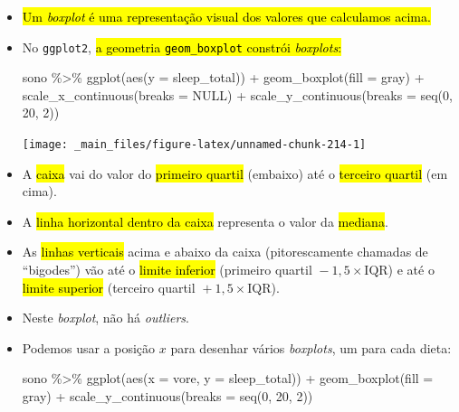 \documentclass[
  11pt]{report}
\newenvironment{Shaded}{\begin{snugshade}}{\end{snugshade}}
\newcommand{\AttributeTok}[1]{\textcolor[rgb]{0.77,0.63,0.00}{#1}}
\newcommand{\ConstantTok}[1]{\textcolor[rgb]{0.00,0.00,0.00}{#1}}
\newcommand{\DecValTok}[1]{\textcolor[rgb]{0.00,0.00,0.81}{#1}}
\newcommand{\FunctionTok}[1]{\textcolor[rgb]{0.00,0.00,0.00}{#1}}
\newcommand{\NormalTok}[1]{#1}
\newcommand{\SpecialCharTok}[1]{\textcolor[rgb]{0.00,0.00,0.00}{#1}}
\newcommand{\StringTok}[1]{\textcolor[rgb]{0.31,0.60,0.02}{#1}}
\renewenvironment{Shaded}{
    \begin{mdframed}[%
      roundcorner=2pt,%
      innerleftmargin=5pt,%
      innerrightmargin=5pt,%
      topline=true,%
      leftline=true,%
      rightline=true,%
      bottomline=true,%
      linewidth=0.5pt,%
      linecolor=black!20,%
      backgroundcolor=black!2,%
      skipabove=2ex,%
      skipbelow=2.5ex%
    ]%
  }
  {
    \end{mdframed}
  }
\begin{document}
\begin{itemize}
\item
  {\hl{Um \emph{boxplot} é uma representação visual dos valores que calculamos acima.}}
\item
  No \texttt{ggplot2}, {\hl{a geometria {\mbox{\texttt{geom\_boxplot}}} constrói \emph{boxplots}:}}

\begin{Shaded}
\begin{Highlighting}[]
\NormalTok{sono }\SpecialCharTok{\%\textgreater{}\%} 
  \FunctionTok{ggplot}\NormalTok{(}\FunctionTok{aes}\NormalTok{(}\AttributeTok{y =}\NormalTok{ sleep\_total)) }\SpecialCharTok{+}
    \FunctionTok{geom\_boxplot}\NormalTok{(}\AttributeTok{fill =} \StringTok{\textquotesingle{}gray\textquotesingle{}}\NormalTok{) }\SpecialCharTok{+}
    \FunctionTok{scale\_x\_continuous}\NormalTok{(}\AttributeTok{breaks =} \ConstantTok{NULL}\NormalTok{) }\SpecialCharTok{+}
    \FunctionTok{scale\_y\_continuous}\NormalTok{(}\AttributeTok{breaks =} \FunctionTok{seq}\NormalTok{(}\DecValTok{0}\NormalTok{, }\DecValTok{20}\NormalTok{, }\DecValTok{2}\NormalTok{))}
\end{Highlighting}
\end{Shaded}

  \begin{center}\texttt{[image: \_main\_files/figure-latex/unnamed-chunk-214-1]} \end{center}
\item
  A {\hl{caixa}} vai do valor do {\hl{primeiro quartil}} (embaixo) até o {\hl{terceiro quartil}} (em cima).
\item
  A {\hl{linha horizontal dentro da caixa}} representa o valor da {\hl{mediana}}.
\item
  As {\hl{linhas verticais}} acima e abaixo da caixa (pitorescamente chamadas de ``bigodes'') vão até o {\hl{limite inferior}} (primeiro quartil ${}- 1{,}5 \times \text{IQR}$) e até o {\hl{limite superior}} (terceiro quartil ${}+ 1{,}5 \times \text{IQR}$).
\item
  Neste \emph{boxplot}, não há \emph{outliers}.
\item
  \protect\hypertarget{onivoros}{}{} Podemos usar a posição $x$ para desenhar vários \emph{boxplots}, um para cada dieta:

\begin{Shaded}
\begin{Highlighting}[]
\NormalTok{sono }\SpecialCharTok{\%\textgreater{}\%} 
  \FunctionTok{ggplot}\NormalTok{(}\FunctionTok{aes}\NormalTok{(}\AttributeTok{x =}\NormalTok{ vore, }\AttributeTok{y =}\NormalTok{ sleep\_total)) }\SpecialCharTok{+}
    \FunctionTok{geom\_boxplot}\NormalTok{(}\AttributeTok{fill =} \StringTok{\textquotesingle{}gray\textquotesingle{}}\NormalTok{) }\SpecialCharTok{+}
    \FunctionTok{scale\_y\_continuous}\NormalTok{(}\AttributeTok{breaks =} \FunctionTok{seq}\NormalTok{(}\DecValTok{0}\NormalTok{, }\DecValTok{20}\NormalTok{, }\DecValTok{2}\NormalTok{))}
\end{Highlighting}
\end{Shaded}


\end{itemize}
\end{document}
